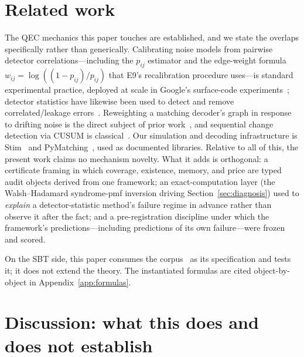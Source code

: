 \documentclass[11pt]{article}
\theoremstyle{definition}
\begin{document}
 \section{Related work}
\label{sec:related}

The QEC mechanics this paper touches are established, and we state the overlaps specifically rather than generically. Calibrating noise models from pairwise detector correlations---including the $p_{ij}$ estimator and the edge-weight formula $w_{ij} = \log((1-p_{ij})/p_{ij})$ that E9's recalibration procedure uses---is standard experimental practice, deployed at scale in Google's surface-code experiments~\cite{google2023suppressing}; detector statistics have likewise been used to detect and remove correlated/leakage errors~\cite{mcewen2021removing}. Reweighting a matching decoder's graph in response to drifting noise is the direct subject of prior work~\cite{dgr2023reweighting}, and sequential change detection via CUSUM is classical~\cite{page1954continuous}. Our simulation and decoding infrastructure is Stim~\cite{gidney2021stim} and PyMatching~\cite{higgott2022pymatching,higgott2025sparseblossom}, used as documented libraries. Relative to all of this, the present work claims no mechanism novelty. What it adds is orthogonal: a certificate framing in which coverage, existence, memory, and price are typed audit objects derived from one framework; an exact-computation layer (the Walsh--Hadamard syndrome-pmf inversion driving Section~\ref{sec:diagnosis}) used to \emph{explain} a detector-statistic method's failure regime in advance rather than observe it after the fact; and a pre-registration discipline under which the framework's predictions---including predictions of its own failure---were frozen and scored.

On the SBT side, this paper consumes the corpus~\cite{sbt-f1,sbt-f3,sbt-xi,sbt-hol,sbt-pt,sbt-ng,sbt-cast,sbt-xor,sbt-spend,sbt-qm,sbt-hid,sbt-nk} as its specification and tests it; it does not extend the theory. The instantiated formulas are cited object-by-object in Appendix~\ref{app:formulas}.

 \section{Discussion: what this does and does not establish}
\label{sec:discussion}
\end{document}
